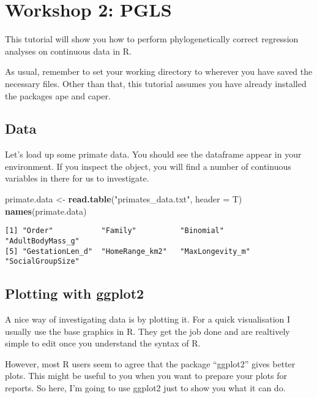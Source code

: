 \documentclass[]{book}
\newenvironment{Shaded}{\begin{snugshade}}{\end{snugshade}}
\newcommand{\KeywordTok}[1]{\textcolor[rgb]{0.13,0.29,0.53}{\textbf{#1}}}
\newcommand{\DataTypeTok}[1]{\textcolor[rgb]{0.13,0.29,0.53}{#1}}
\newcommand{\StringTok}[1]{\textcolor[rgb]{0.31,0.60,0.02}{#1}}
\newcommand{\NormalTok}[1]{#1}
\begin{document}
\chapter{Workshop 2: PGLS}\label{w2PGLS}

This tutorial will show you how to perform phylogenetically correct
regression analyses on continuous data in R.

As usual, remember to set your working directory to wherever you have
saved the necessary files. Other than that, this tutorial assumes you
have already installed the packages ape and caper.

\section{Data}\label{data}

Let's load up some primate data. You should see the dataframe appear in
your environment. If you inspect the object, you will find a number of
continuous variables in there for us to investigate.

\begin{Shaded}
\begin{Highlighting}[]
\NormalTok{primate.data <-}\StringTok{ }\KeywordTok{read.table}\NormalTok{(}\StringTok{"primates_data.txt"}\NormalTok{, }\DataTypeTok{header =}\NormalTok{ T)}
\KeywordTok{names}\NormalTok{(primate.data)}
\end{Highlighting}
\end{Shaded}

\begin{verbatim}
[1] "Order"           "Family"          "Binomial"        "AdultBodyMass_g"
[5] "GestationLen_d"  "HomeRange_km2"   "MaxLongevity_m"  "SocialGroupSize"
\end{verbatim}

\section{Plotting with ggplot2}\label{plotting-with-ggplot2}

A nice way of investigating data is by plotting it. For a quick
visualisation I usually use the base graphics in R. They get the job
done and are realtively simple to edit once you understand the syntax of
R.

However, most R users seem to agree that the package ``ggplot2'' gives
better plots. This might be useful to you when you want to prepare your
plots for reports. So here, I'm going to use ggplot2 just to show you
what it can do.
\end{document}
